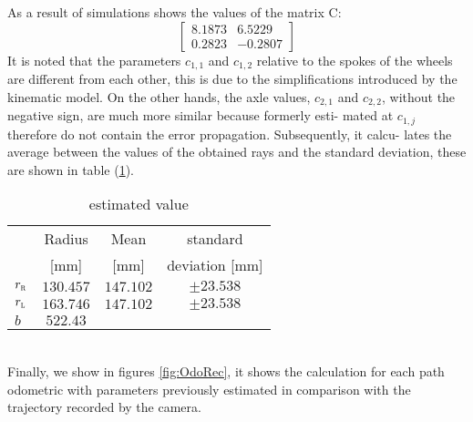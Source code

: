  As a result of simulations shows the values of the matrix C:
\begin{equation}
\label{eq:Cresult}
	\begin{bmatrix}
		8.1873  &  6.5229\\
    	0.2823 &  -0.2807
	\end{bmatrix}
\end{equation}
It is noted that the parameters $c_{1,1}$ and $c_{1,2}$ relative to the spokes of the wheels are different from each other, this is due to the simplifications introduced by the kinematic model. On the other hands, the axle values, $c_ {2,1}$ and $c_ {2,2}$, without the negative sign, are much more similar because formerly esti- mated at $c_{1,j}$ therefore do not contain the error propagation. Subsequently, it calcu- lates the average between the values of the obtained rays and the standard deviation, these are shown in table (\ref{tab:recapvalue}).
\begin{table}[!h]
\centering
	\begin{tabular}{lccc}
		\hline
								& Radius 	& Mean 	& standard\\
								&	[mm]	& [mm]	& deviation [mm]\\
		\hline
		$r_\textsc{r}$	&	$130.457$		& $147.102	$		&	$\pm23.538$\\
		$r_\textsc{l}$	&	$163.746$		& $147.102	$		&	$\pm23.538$\\
		$b$					&	$522.43$\\
		\hline
\end{tabular}
\caption{estimated value}
\label{tab:recapvalue}
\end{table}
\\Finally, we show in figures \ref{fig:OdoRec}, it shows the calculation for each path odometric with parameters previously estimated in comparison with the trajectory recorded by the camera.
\begin{figure*}[htb]
\centering
{} \,
 \\
 \,
\caption{Odometry reconstruction}
\label{fig:OdoRec}
\end{figure*}

